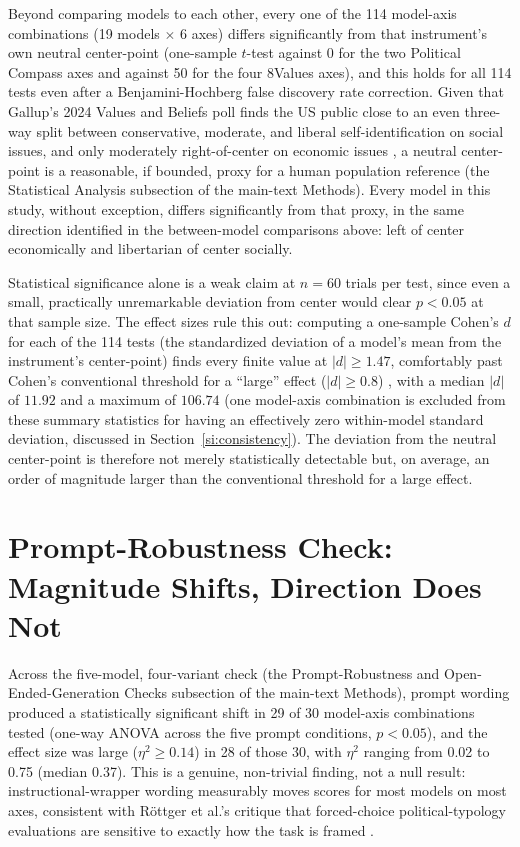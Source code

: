 \documentclass[11pt]{article}
\begin{document}
Beyond comparing models to each other, every one of the 114 model-axis
combinations (19 models $\times$ 6 axes) differs significantly from that
instrument's own neutral center-point (one-sample $t$-test against 0 for the two
Political Compass axes and against 50 for the four 8Values axes), and this holds
for all 114 tests even after a Benjamini-Hochberg false discovery rate correction.
Given that Gallup's 2024 Values and Beliefs poll finds the US public close to an
even three-way split between conservative, moderate, and liberal self-identification
on social issues, and only moderately right-of-center on economic issues
\cite{gallup2024values}, a neutral center-point is a reasonable, if bounded, proxy
for a human population reference (the Statistical Analysis subsection of the main-text Methods). Every model in this
study, without exception, differs significantly from that proxy, in the same
direction identified in the between-model comparisons above: left of center
economically and libertarian of center socially.

Statistical significance alone is a weak claim at $n=60$ trials per test, since
even a small, practically unremarkable deviation from center would clear
$p<0.05$ at that sample size. The effect sizes rule this out: computing a
one-sample Cohen's $d$ for each of the 114 tests (the standardized deviation of
a model's mean from the instrument's center-point) finds every finite value at
$|d|\geq 1.47$, comfortably past Cohen's conventional threshold for a
``large'' effect ($|d|\geq 0.8$) \cite{cohen1988}, with a median $|d|$ of
$11.92$ and a maximum of $106.74$ (one model-axis combination is excluded
from these summary statistics for having an effectively zero within-model
standard deviation, discussed in Section~\ref{si:consistency}). The deviation
from the neutral center-point is therefore not merely statistically
detectable but, on average, an order of magnitude larger than the
conventional threshold for a large effect.

\section{Prompt-Robustness Check: Magnitude Shifts, Direction Does Not}
\label{si:prompt-robustness}

Across the five-model, four-variant check (the Prompt-Robustness and Open-Ended-Generation Checks subsection of the main-text Methods),
prompt wording produced a statistically significant shift in 29 of 30
model-axis combinations tested (one-way ANOVA across the five prompt conditions,
$p<0.05$), and the effect size was large ($\eta^2 \geq 0.14$) in 28 of those 30,
with $\eta^2$ ranging from 0.02 to 0.75 (median 0.37). This is a genuine,
non-trivial finding, not a null result: instructional-wrapper wording measurably
moves scores for most models on most axes, consistent with Röttger et al.'s
critique that forced-choice political-typology evaluations are sensitive to
exactly how the task is framed \cite{rottger2024}.
\end{document}
